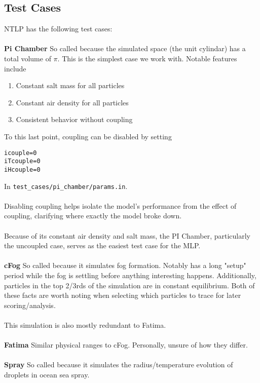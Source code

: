 \documentclass{article}
\begin{document}
\subsection{Test Cases}
NTLP has the following test cases:\\\\
\textbf{Pi Chamber}
So called because the simulated space (the unit cylindar) has a total volume of $\pi$. This is the simplest case we work with. Notable features include
\begin{enumerate}
	\item Constant salt mass for all particles
	\item Constant air density for all particles
	\item Consistent behavior without coupling
\end{enumerate}
To this last point, coupling can be disabled by setting
\begin{lstlisting}
icouple=0
iTcouple=0
iHcouple=0
\end{lstlisting}
In \lstinline{test_cases/pi_chamber/params.in}.\\\\
Disabling coupling helps isolate the model's performance from the effect of coupling, clarifying where exactly the model broke down.\\\\
Because of its constant air density and salt mass, the PI Chamber, particularly the uncoupled case, serves as the easiest test case for the MLP.\\ \\
\textbf{cFog}
So called because it simulates fog formation. Notably has a long "setup" period while the fog is settling before anything interesting happens. Additionally, particles in the top 2/3rds of the simulation are in constant equilibrium. Both of these facts are worth noting when selecting which particles to trace for later scoring/analysis.\\\\
This simulation is also mostly redundant to Fatima.\\\\
\textbf{Fatima}
Similar physical ranges to cFog. Personally, unsure of how they differ.\\\\
\textbf{Spray}
So called because it simulates the radius/temperature evolution of droplets in ocean sea spray.
\end{document}
